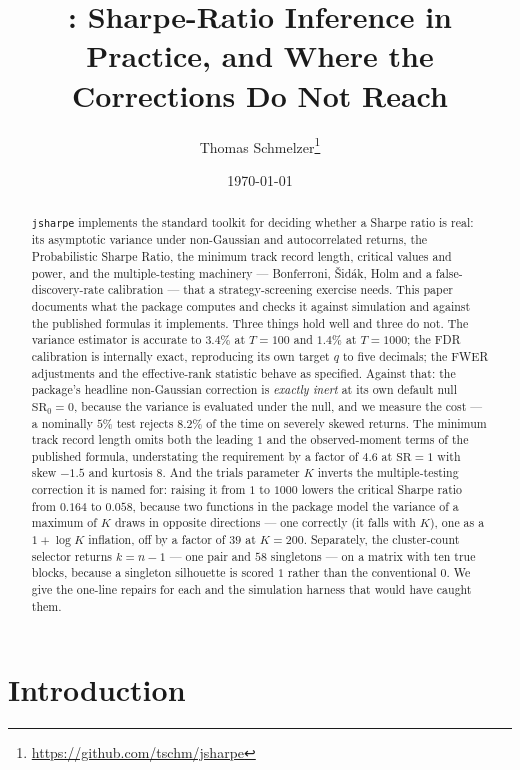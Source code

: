 \documentclass[11pt,a4paper]{article}
\title{\code{jsharpe}: Sharpe-Ratio Inference in Practice, and Where the
Corrections Do Not Reach}
\author{Thomas Schmelzer\thanks{\url{https://github.com/tschm/jsharpe}}}
\date{\today}
\newcommand{\code}[1]{\texttt{#1}}
\newcommand{\SR}{\mathrm{SR}}
\begin{document}
\maketitle

\begin{abstract}
\code{jsharpe} implements the standard toolkit for deciding whether a Sharpe
ratio is real: its asymptotic variance under non-Gaussian and autocorrelated
returns, the Probabilistic Sharpe Ratio, the minimum track record length,
critical values and power, and the multiple-testing machinery --- Bonferroni,
{\v S}id{\'a}k, Holm and a false-discovery-rate calibration --- that a
strategy-screening exercise needs. This paper documents what the package
computes and checks it against simulation and against the published formulas
it implements. Three things hold well and three do not. The variance estimator
is accurate to $3.4\%$ at $T = 100$ and $1.4\%$ at $T = 1000$; the FDR
calibration is internally exact, reproducing its own target $q$ to five
decimals; the FWER adjustments and the effective-rank statistic behave as
specified. Against that: the package's headline non-Gaussian correction is
\emph{exactly inert} at its own default null $\SR_0 = 0$, because the variance
is evaluated under the null, and we measure the cost --- a nominally $5\%$
test rejects $8.2\%$ of the time on severely skewed returns. The minimum track
record length omits both the leading $1$ and the observed-moment terms of the
published formula, understating the requirement by a factor of $4.6$ at
$\SR = 1$ with skew $-1.5$ and kurtosis $8$. And the trials parameter $K$
inverts the multiple-testing correction it is named for: raising it from $1$ to
$1000$ lowers the critical Sharpe ratio from $0.164$ to $0.058$, because two
functions in the package model the variance of a maximum of $K$ draws in
opposite directions --- one correctly (it falls with $K$), one as a
$1 + \log K$ inflation, off by a factor of $39$ at $K = 200$. Separately, the
cluster-count selector returns $k = n-1$ --- one pair and $58$ singletons --- on
a matrix with ten true blocks, because a singleton silhouette is scored $1$
rather than the conventional $0$. We give the one-line repairs for each and the
simulation harness that would have caught them.
\end{abstract}

\section{Introduction}
\end{document}
